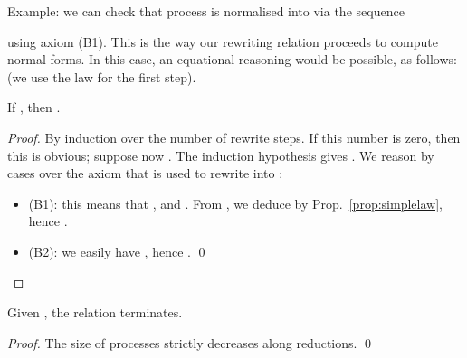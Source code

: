 \documentclass{llncs}
\begin{document}
Example: we can check that process  is
normalised into  via the sequence

using axiom (B1). This is the way our rewriting relation proceeds to
compute normal forms. In this case, an equational reasoning would be
possible, as follows:  (we use the law  for the first step).

\begin{lem}\label{lem:rewr:TT}
  If , then .
\end{lem}
\begin{proof}
  By induction over the number of rewrite steps. If this number is
  zero, then this is obvious; suppose now . The
  induction hypothesis gives . We reason by cases over the
  axiom that is used to rewrite  into :
\begin{itemize}
  \item (B1): this means that , 
    and . From , we deduce
     by Prop.~\ref{prop:simplelaw},
    hence .
  \item (B2): we easily have , hence .
    \qed
  \end{itemize}
\end{proof}

\begin{lem}\label{lem:rewr:sn}
  Given , the relation  terminates.
\end{lem}
\begin{proof}
  The size of processes strictly decreases along reductions.  \qed
\end{proof}
\end{document}
